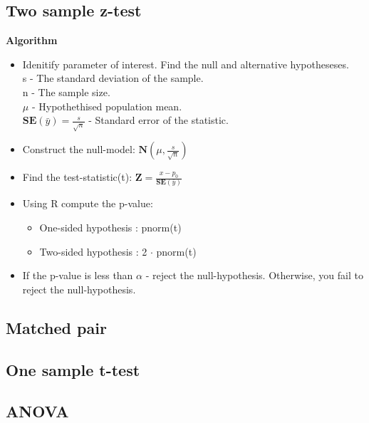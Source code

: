 \documentclass{article}
\begin{document}
\subsection{Two sample z-test}
\textbf{Algorithm}
\begin{itemize}
\item Idenitify parameter of interest. Find the null and alternative hypotheseses.\\
      s - The standard deviation of the sample.\\
      n - The sample size.\\
      $\mu$ - Hypothethised population mean.\\
      $\mathbf{SE}(\bar{y}) = \frac{s}{\sqrt{n}}$ - Standard error of the statistic.
\item Construct the null-model: $\mathbf{N}(\mu,\frac{s}{\sqrt{n}})$
\item Find the test-statistic(t): $\mathbf{Z} = \frac{x-p_0}{\mathbf{SE}(\bar{y})}$
\item Using R compute the p-value:
\begin{itemize}
    \item One-sided hypothesis : pnorm(t)
    \item Two-sided hypothesis : 2 $\cdot$ pnorm(t)
\end{itemize}
\item If the p-value is less than $\alpha$ - reject the null-hypothesis. 
    Otherwise, you fail to reject the null-hypothesis.
\end{itemize}
\subsection{Matched pair}
\subsection{One sample t-test}
\subsection{ANOVA}
\end{document}
